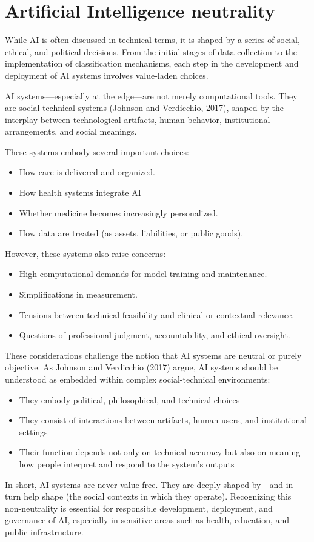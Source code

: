 \section{Artificial Intelligence neutrality}

While AI is often discussed in technical terms, it is shaped by a series of social, ethical, and political decisions. 
From the initial stages of data collection to the implementation of classification mechanisms, each step in the development and deployment of AI systems involves value-laden choices.

AI systems—especially at the edge—are not merely computational tools. 
They are social-technical systems (Johnson and Verdicchio, 2017), shaped by the interplay between technological artifacts, human behavior, institutional arrangements, and social meanings.

These systems embody several important choices:
\begin{itemize}
    \item How care is delivered and organized.
   \item How health systems integrate AI
   \item Whether medicine becomes increasingly personalized.
   \item How data are treated (as assets, liabilities, or public goods).
\end{itemize}
\noindent However, these systems also raise concerns:
\begin{itemize}
    \item High computational demands for model training and maintenance.
    \item Simplifications in measurement.
    \item Tensions between technical feasibility and clinical or contextual relevance.
    \item Questions of professional judgment, accountability, and ethical oversight.
\end{itemize}

These considerations challenge the notion that AI systems are neutral or purely objective. 
As Johnson and Verdicchio (2017) argue, AI systems should be understood as embedded within complex social-technical environments:
\begin{itemize}
    \item They embody political, philosophical, and technical choices
    \item They consist of interactions between artifacts, human users, and institutional settings
    \item Their function depends not only on technical accuracy but also on meaning—how people interpret and respond to the system's outputs
\end{itemize}
\noindent In short, AI systems are never value-free. 
They are deeply shaped by—and in turn help shape (the social contexts in which they operate). 
Recognizing this non-neutrality is essential for responsible development, deployment, and governance of AI, especially in sensitive areas such as health, education, and public infrastructure.
